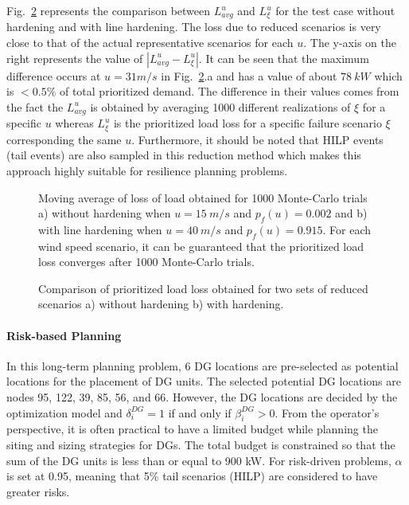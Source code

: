 Fig.~\ref{fig:scenario_reduction} represents the comparison between $L^u_{avg}$ and $L^u_\xi$ for the test case without hardening and with line hardening. The loss due to reduced scenarios is very close to that of the actual representative scenarios for each $u$. The y-axis on the right represents the value of $|L^u_{avg} - L^u_\xi|$. It can be seen that the maximum difference occurs at $u = 31 m/s$ in Fig.~\ref{fig:scenario_reduction}.a and has a value of about $78~kW$ which is $< 0.5\%$ of total prioritized demand. The difference in their values comes from the fact the $L^u_{avg}$ is obtained by averaging 1000 different realizations of $\xi$ for a specific $u$ whereas $L^u_\xi$ is the prioritized load loss for a specific failure scenario $\xi$ corresponding the same $u$. Furthermore, it should be noted that HILP events (tail events) are also sampled in this reduction method which makes this approach highly suitable for resilience planning problems.

\begin{figure}[t]
     \centering
     {
        \label{fig:MCS_1}
    }\hfill
    {
        \label{fig:MCS_2}
     }
     \caption{Moving average of loss of load obtained for 1000 Monte-Carlo trials a) without hardening when $u = 15~m/s$ and $p_f(u) = 0.002$ and b) with line hardening when $u = 40~m/s$ and $p_f(u) = 0.915$. For each wind speed scenario, it can be guaranteed that the prioritized load loss converges after 1000 Monte-Carlo trials.}
     \label{fig:MCS_convergence}
\end{figure}

\begin{figure}[h]
     \centering
     {
        \label{fig:scen_set_1}
    }\hfill
    {
        \label{fig:scen_set_2}
     }
     \caption{Comparison of prioritized load loss obtained for two sets of reduced scenarios a) without hardening b) with hardening.}
     \label{fig:scenario_reduction}
\end{figure}

\paragraph{Risk-based Planning}
In this long-term planning problem, 6 DG locations are pre-selected as potential locations for the placement of DG units. The selected potential DG locations are nodes 95, 122, 39, 85, 56, and 66. However, the DG locations are decided by the optimization model and $\delta_i^{DG} = 1$ if and only if $\beta_i^{DG} > 0$. From the operator's perspective, it is often practical to have a limited budget while planning the siting and sizing strategies for DGs. The total budget is constrained so that the sum of the DG units is less than or equal to 900 kW.  For risk-driven problems, $\alpha$ is set at 0.95, meaning that 5\% tail scenarios (HILP) are considered to have greater risks.

